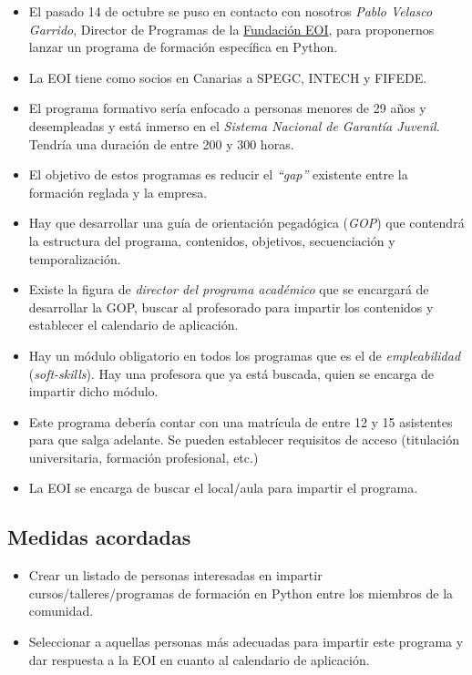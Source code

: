 \documentclass[a4paper, 12pt]{article}
\begin{document}
\begin{itemize}
    \item El pasado 14 de octubre se puso en contacto con nosotros \textit{Pablo Velasco Garrido}, Director de Programas de la \href{https://www.eoi.es}{Fundación EOI}, para proponernos lanzar un programa de formación específica en Python.
    \item La EOI tiene como socios en Canarias a SPEGC, INTECH y FIFEDE.
    \item El programa formativo sería enfocado a personas menores de 29 años y desempleadas y está inmerso en el \textit{Sistema Nacional de Garantía Juvenil}. Tendría una duración de entre 200 y 300 horas.
    \item El objetivo de estos programas es reducir el \textit{``gap''} existente entre la formación reglada y la empresa.
    \item Hay que desarrollar una guía de orientación pegadógica (\textit{GOP}) que contendrá la estructura del programa, contenidos, objetivos, secuenciación y temporalización.
    \item Existe la figura de \textit{director del programa académico} que se encargará de desarrollar la GOP, buscar al profesorado para impartir los contenidos y establecer el calendario de aplicación.
    \item Hay un módulo obligatorio en todos los programas que es el de \textit{empleabilidad} (\textit{soft-skills}). Hay una profesora que ya está buscada, quien se encarga de impartir dicho módulo.
    \item Este programa debería contar con una matrícula de entre 12 y 15 asistentes para que salga adelante. Se pueden establecer requisitos de acceso (titulación universitaria, formación profesional, etc.)
    \item La EOI se encarga de buscar el local/aula para impartir el programa.
\end{itemize}

\subsection*{Medidas acordadas}

\begin{itemize}
    \item Crear un listado de personas interesadas en impartir cursos/talleres/programas de formación en Python entre los miembros de la comunidad.
    \item Seleccionar a aquellas personas más adecuadas para impartir este programa y dar respuesta a la EOI en cuanto al calendario de aplicación.
\end{itemize}
\end{document}
